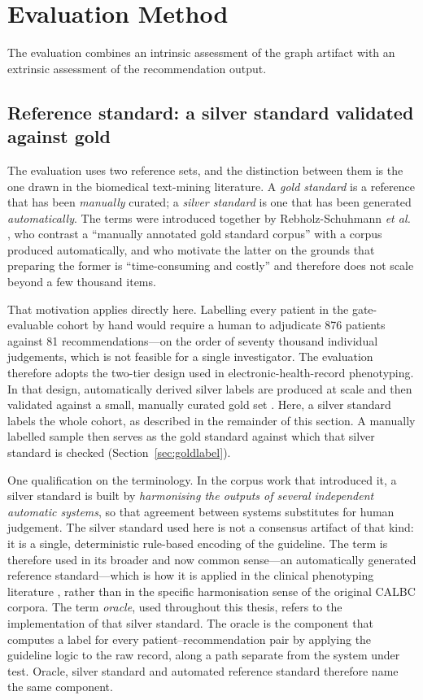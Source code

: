 \section{Evaluation Method}
\label{sec:eval-method}

The evaluation combines an intrinsic assessment of the graph artifact with an extrinsic
assessment of the recommendation output.

\subsection{Reference standard: a silver standard validated against gold}
\label{sec:oracle}

The evaluation uses two reference sets, and the distinction between them is the one drawn
in the biomedical text-mining literature. A \emph{gold standard} is a reference that has
been \emph{manually} curated; a \emph{silver standard} is one that has been generated
\emph{automatically}. The terms were introduced together by Rebholz-Schuhmann
\textit{et al.} \cite{rebholz2010,rebholz2011}, who contrast a ``manually annotated gold
standard corpus'' with a corpus produced automatically, and who motivate the latter on the
grounds that preparing the former is ``time-consuming and costly'' and therefore does not
scale beyond a few thousand items.

That motivation applies directly here. Labelling every patient in the gate-evaluable
cohort by hand would require a human to adjudicate 876 patients against
81 recommendations---on the order of seventy thousand individual judgements,
which is not feasible for a single investigator. The evaluation therefore adopts the two-tier design used in electronic-health-record
phenotyping. In that design, automatically derived silver labels are produced at scale and
then validated against a small, manually curated gold set \cite{nogues2022}. Here, a silver
standard labels the whole cohort, as described in the remainder of this section. A manually
labelled sample then serves as the gold standard against which that silver standard is
checked (Section~\ref{sec:goldlabel}).

One qualification on the terminology. In the corpus work that introduced it, a silver
standard is built by \emph{harmonising the outputs of several independent automatic
systems}, so that agreement between systems substitutes for human judgement. The silver
standard used here is not a consensus artifact of that kind: it is a single, deterministic
rule-based encoding of the guideline. The term is therefore used in its broader and now
common sense---an automatically generated reference standard---which is how it is applied
in the clinical phenotyping literature \cite{nogues2022}, rather than in the specific
harmonisation sense of the original CALBC corpora.
The term \emph{oracle}, used throughout this thesis, refers to the implementation of that
silver standard. The oracle is the component that computes a label for every
patient--recommendation pair by applying the guideline logic to the raw record, along a path
separate from the system under test. Oracle, silver standard and automated reference standard
therefore name the same component.

